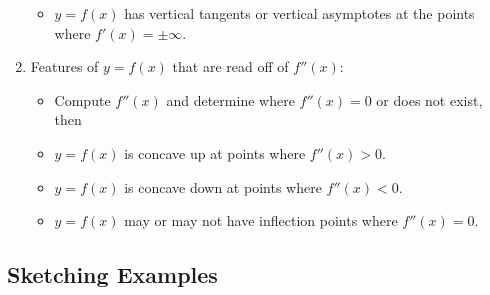 \begin{enumerate}[(1)]
\begin{itemize}
\item $y=f(x)$ has vertical tangents or vertical asymptotes at the points
where $f'(x)=\pm\infty$.
\end{itemize}


\item Features of $y=f(x)$ that are read off of $f''(x)$:
\begin{itemize}
\item Compute $f''(x)$ and determine where $f''(x)=0$ or does not exist, then

\item $y=f(x)$ is concave up at points where $f''(x)>0$.

\item $y=f(x)$ is concave down at points where $f''(x)<0$.

\item $y=f(x)$ may or may not have inflection points where $f''(x)=0$.

\end{itemize}
\end{enumerate}

\subsection{Sketching Examples}

